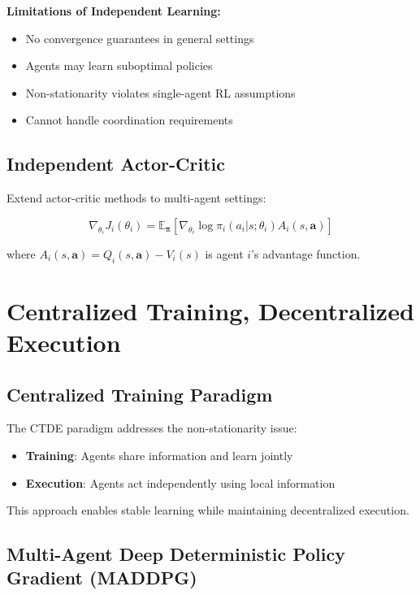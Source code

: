\textbf{Limitations of Independent Learning:}
\begin{itemize}
    \item No convergence guarantees in general settings
    \item Agents may learn suboptimal policies
    \item Non-stationarity violates single-agent RL assumptions
    \item Cannot handle coordination requirements
\end{itemize}

\subsection{Independent Actor-Critic}

Extend actor-critic methods to multi-agent settings:

\begin{equation}
\nabla_{\theta_i} J_i(\theta_i) = \mathbb{E}_{\boldsymbol{\pi}} \left[ \nabla_{\theta_i} \log \pi_i(a_i|s; \theta_i) A_i(s, \mathbf{a}) \right]
\end{equation}

where $A_i(s, \mathbf{a}) = Q_i(s, \mathbf{a}) - V_i(s)$ is agent $i$'s advantage function.

\section{Centralized Training, Decentralized Execution}

\subsection{Centralized Training Paradigm}

The CTDE paradigm addresses the non-stationarity issue:
\begin{itemize}
    \item \textbf{Training}: Agents share information and learn jointly
    \item \textbf{Execution}: Agents act independently using local information
\end{itemize}

This approach enables stable learning while maintaining decentralized execution.

\subsection{Multi-Agent Deep Deterministic Policy Gradient (MADDPG)}

